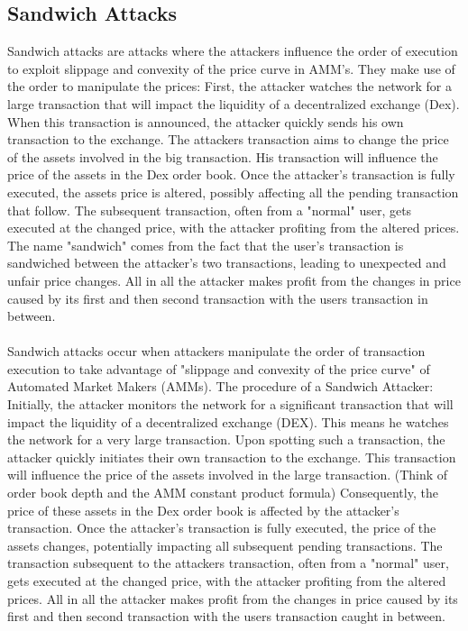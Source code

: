 \documentclass{article}
\begin{document}
\subsection{Sandwich Attacks}
Sandwich attacks are attacks where the attackers influence the order of execution to exploit slippage and convexity of the price curve in AMM's. They make use of the order to manipulate the prices: First, the attacker watches the network for a large transaction that will impact the liquidity of a decentralized exchange (Dex). When this transaction is announced, the attacker quickly sends his own transaction to the exchange. The attackers transaction aims to change the price of the assets involved in the big transaction. His transaction will influence the price of the assets in the Dex order book. Once the attacker's transaction is fully executed, the assets price is altered, possibly affecting all the pending transaction that follow. The subsequent transaction, often from a "normal" user, gets executed at the changed price, with the attacker profiting from the altered prices. The name "sandwich" comes from the fact that the user's transaction is sandwiched between the attacker's two transactions, leading to unexpected and unfair price changes. All in all the attacker makes profit from the changes in price caused by its first and then second transaction with the users transaction in between.\\
\\
Sandwich attacks occur when attackers manipulate the order of transaction execution to take advantage of "slippage and convexity of the price curve" of Automated Market Makers (AMMs). The procedure of a Sandwich Attacker: Initially, the attacker monitors the network for a significant transaction that will impact the liquidity of a decentralized exchange (DEX). This means he watches the network for a very large transaction.  Upon spotting such a transaction, the attacker quickly initiates their own transaction to the exchange. This transaction will influence the price of the assets involved in the large transaction. (Think of order book depth and the AMM constant product formula) Consequently, the price of these assets in the Dex order book is affected by the attacker's transaction. Once the attacker's transaction is fully executed, the price of the assets changes, potentially impacting all subsequent pending transactions. The transaction subsequent to the attackers transaction, often from a "normal" user, gets executed at the changed price, with the attacker profiting from the altered prices. All in all the attacker makes profit from the changes in price caused by its first and then second transaction with the users transaction caught in between.\\ 
\end{document}
